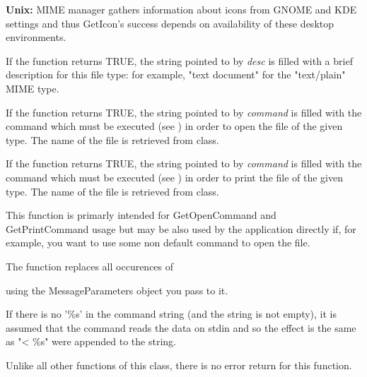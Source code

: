 {\bf Unix:} MIME manager gathers information about icons from GNOME
and KDE settings and thus GetIcon's success depends on availability
of these desktop environments.

\label{wxfiletypegetdescription}


If the function returns TRUE, the string pointed to by {\it desc} is filled
with a brief description for this file type: for example, "text document" for
the "text/plain" MIME type.

\label{wxfiletypegetopencommand}


If the function returns TRUE, the string pointed to by {\it command} is filled
with the command which must be executed (see ) in
order to open the file of the given type. The name of the file is
retrieved from  class.

\label{wxfiletypegetprintcommand}


If the function returns TRUE, the string pointed to by {\it command} is filled
with the command which must be executed (see ) in
order to print the file of the given type. The name of the file is
retrieved from  class.

\label{wxfiletypeexpandcommand}


This function is primarly intended for GetOpenCommand and GetPrintCommand
usage but may be also used by the application directly if, for example, you want
to use some non default command to open the file.

The function replaces all occurences of

\twocolwidtha{7cm}
\begin{twocollist}\itemsep=0pt
\end{twocollist}

using the MessageParameters object you pass to it.

If there is no '\%s' in the command string (and the string is not empty), it is
assumed that the command reads the data on stdin and so the effect is the same
as "< \%s" were appended to the string.

Unlike all other functions of this class, there is no error return for this
function.


